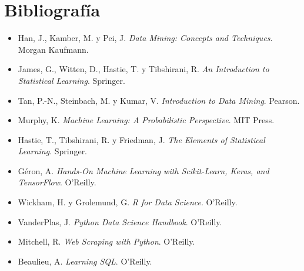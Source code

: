 \documentclass[12pt]{article}
\begin{document}
\section*{Bibliografía}
\begin{itemize}
    \item Han, J., Kamber, M. y Pei, J. \textit{Data Mining: Concepts and Techniques}. Morgan Kaufmann.
    
    \item James, G., Witten, D., Hastie, T. y Tibshirani, R. \textit{An Introduction to Statistical Learning}. Springer.
    
    \item Tan, P.-N., Steinbach, M. y Kumar, V. \textit{Introduction to Data Mining}. Pearson.
    
    \item Murphy, K. \textit{Machine Learning: A Probabilistic Perspective}. MIT Press.
    
    \item Hastie, T., Tibshirani, R. y Friedman, J. \textit{The Elements of Statistical Learning}. Springer.
    
    \item Géron, A. \textit{Hands-On Machine Learning with Scikit-Learn, Keras, and TensorFlow}. O'Reilly.
    
    \item Wickham, H. y Grolemund, G. \textit{R for Data Science}. O'Reilly.
    
    \item VanderPlas, J. \textit{Python Data Science Handbook}. O'Reilly.
    
    \item Mitchell, R. \textit{Web Scraping with Python}. O'Reilly.
    
    \item Beaulieu, A. \textit{Learning SQL}. O'Reilly.
\end{itemize}
\end{document}
